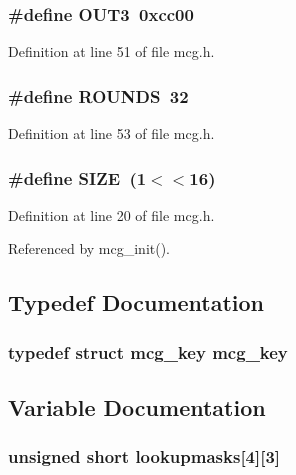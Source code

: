 \subsubsection{\setlength{\rightskip}{0pt plus 5cm}\#define OUT3\ 0xcc00}\label{mcg_8h_a16}




Definition at line 51 of file mcg.h.
\subsubsection{\setlength{\rightskip}{0pt plus 5cm}\#define ROUNDS\ 32}\label{mcg_8h_a17}




Definition at line 53 of file mcg.h.
\subsubsection{\setlength{\rightskip}{0pt plus 5cm}\#define SIZE\ (1$<$$<$16)}\label{mcg_8h_a0}




Definition at line 20 of file mcg.h.

Referenced by mcg\_\-init().

\subsection{Typedef Documentation}
\subsubsection{\setlength{\rightskip}{0pt plus 5cm}typedef struct {\bf mcg\_\-key}  {\bf mcg\_\-key}}\label{mcg_8h_a22}




\subsection{Variable Documentation}
\subsubsection{\setlength{\rightskip}{0pt plus 5cm}unsigned short {\bf lookupmasks}[4][3]}\label{mcg_8h_a20}





